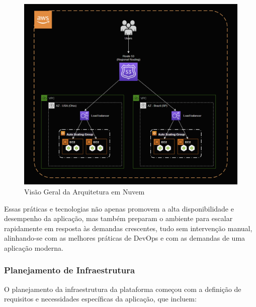 \begin{figure}[H]
    \centering
    \includegraphics[width=\textwidth]{drawio/cloud-architecture.png}
    \caption{Visão Geral da Arquitetura em Nuvem}
    \label{fig:cloud-architecture}
\end{figure}

Essas práticas e tecnologias não apenas promovem a alta disponibilidade e desempenho da aplicação, mas também preparam o ambiente para escalar rapidamente em resposta às demandas crescentes, tudo sem intervenção manual, alinhando-se com as melhores práticas de DevOps e com as demandas de uma aplicação moderna.


\subsubsection{Planejamento de Infraestrutura}

O planejamento da infraestrutura da plataforma começou com a definição de requisitos e necessidades específicas da aplicação, que incluem:

